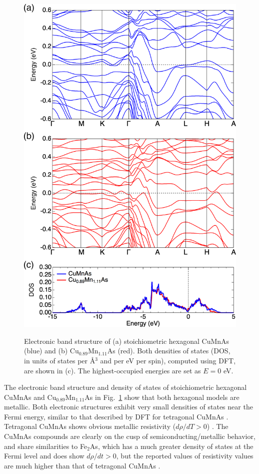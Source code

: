 \documentclass[letterpaper,10pt,doublespacing,edeposit]{uiucthesis2020}
\begin{document}
\begin{mainmatter}
\begin{figure}
\centering\includegraphics[width=0.7\columnwidth]{figures/ch5/h-cumnas-dft-band.png} \\
\caption{\label{fig:DFT-band}
Electronic band structure of (a) stoichiometric hexagonal CuMnAs (blue) and (b) Cu$_{0.89}$Mn$_{1.11}$As (red). Both densities of states (DOS, in units of states per \AA$^3$ and per eV per spin), computed using DFT, are shown in (c).
The highest-occupied energies are set as $E=0$ eV.
}
\end{figure}

The electronic band structure and density of states of stoichiometric hexagonal CuMnAs and Cu$_{0.89}$Mn$_{1.11}$As in Fig.\ \ref{fig:DFT-band} show that both hexagonal models are metallic.
Both electronic structures exhibit very small densities of states near the Fermi energy, similar to that described by DFT for tetragonal CuMnAs \cite{Maca2017}.
Tetragonal CuMnAs shows obvious metallic resistivity ($d\rho/dT > 0$) \cite{Wadley2013}.
The CuMnAs compounds are clearly on the cusp of semiconducting/metallic behavior, and share similarities to Fe$_2$As, which has a much greater density of states at the Fermi level and does show $d\rho/dt > 0$, but the reported values of resistivity values are much higher than that of tetragonal CuMnAs \cite{Yang2019,Takeshita2017}.



\end{mainmatter}
\end{document}
